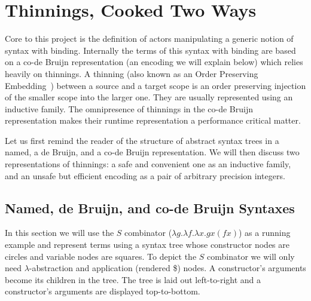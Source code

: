 \section{Thinnings, Cooked Two Ways}\label{sec:codebruijn}

\iftoggle{BLIND}
{In their work on \typos~\cite{MANUAL:talk/types/Allais22}, a domain specific language
to define concurrent typecheckers and elaborators, the authors go out of their way
to avoid using inductive families because of their inefficient runtime representation.
}
{We experienced a major limitation of compilation of inductive families
during our ongoing development of
\typos~\cite{MANUAL:talk/types/Allais22}, a domain specific language
to define concurrent typecheckers and elaborators.
}
%
Core to this project is the definition of actors manipulating a generic notion
of syntax with binding.
%
Internally the terms of this syntax with binding are based on a co-de Bruijn
representation (an encoding we will explain below) which relies heavily on
thinnings.
%
A thinning (also known as an Order Preserving
Embedding~\cite{MANUAL:phd/nott/Chapman09})
between a source and a target scope is an order preserving injection
of the smaller scope into the larger one.
%
They are usually represented using an inductive family.
%
The omnipresence of thinnings in the co-de Bruijn representation makes their
runtime representation a performance critical matter.

Let us first remind the reader of the structure of abstract syntax trees in a
named, a de Bruijn, and a co-de Bruijn representation. We will then discuss two
representations of thinnings: a safe and convenient one as an inductive family,
and an unsafe but efficient encoding as a pair of arbitrary precision integers.

\subsection{Named, de Bruijn, and co-de Bruijn Syntaxes}

In this section we will use
the $S$ combinator ($\lambda g. \lambda f. \lambda x. g x (f x)$)
as a running example and represent
terms using a syntax tree whose constructor nodes are circles and variable nodes
are squares.
%
To depict the $S$ combinator we will only need $\lambda{}$-abstraction and
application (rendered \$) nodes. A constructor's arguments become its children
in the tree.
%
The tree is laid out left-to-right and a constructor's arguments are displayed
top-to-bottom.

